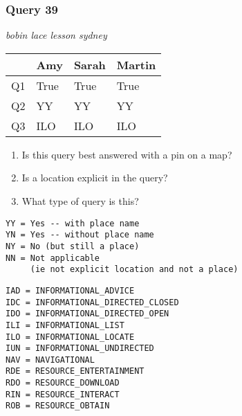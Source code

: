 \begin{frame}[fragile]
\frametitle{Query 39}
\vspace{1em}

\emph{bobin lace lesson sydney}

\vfill

\begin{table}
  \centering
  \begin{tabular}{ l l l l }
    & \textbf{Amy} & \textbf{Sarah} & \textbf{Martin}\\
    \toprule
    Q1 & True & True & True\\
Q2 & YY & YY & YY\\
Q3 & ILO & ILO & ILO\\
    \bottomrule
  \end{tabular}
\end{table}

\vfill

\tiny{

\begin{enumerate}
\item Is this query best answered with a pin on a map?
\item Is a location explicit in the query?
\item What type of query is this?
\end{enumerate}

\vfill

\begin{multicols}{2}
\begin{verbatim}
YY = Yes -- with place name
YN = Yes -- without place name
NY = No (but still a place)
NN = Not applicable 
     (ie not explicit location and not a place)
\end{verbatim}

\columnbreak
\begin{verbatim}
IAD = INFORMATIONAL_ADVICE
IDC = INFORMATIONAL_DIRECTED_CLOSED
IDO = INFORMATIONAL_DIRECTED_OPEN
ILI = INFORMATIONAL_LIST
ILO = INFORMATIONAL_LOCATE
IUN = INFORMATIONAL_UNDIRECTED
NAV = NAVIGATIONAL
RDE = RESOURCE_ENTERTAINMENT
RDO = RESOURCE_DOWNLOAD
RIN = RESOURCE_INTERACT
ROB = RESOURCE_OBTAIN
\end{verbatim}
\end{multicols}
}

\end{frame}



